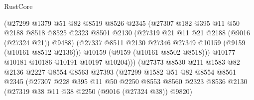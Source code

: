 \begin{lexlean}{RustCore}
\begin{coremodule}
                                (@27299
                                  @1379
                                  @51
                                  @82
                                  @8519
                                  @8526
                                  @2345
                                  (@27307
                                    @182
                                    @395
                                    @11
                                    @50
                                    @2188
                                    @8518
                                    @8525
                                    @2323
                                    @8501
                                    @2130
                                    (@27319 @21 @11 @21 @2188 (@9016 (@27324 @21)) @9488)
                                    (@27337
                                      @8511
                                      @2130
                                      @27346
                                      @27349
                                      @10159
                                      (@9159 (@10161 @8512 @2136)))
                                    @10159
                                    (@9159 (@10161 @8502 @8518)))
                                  @10177
                                  @10181
                                  @10186
                                  @10191
                                  @10197
                                  @10204)))
                            (@27373
                              @8530
                              @211
                              @1583
                              @82
                              @2136
                              @2227
                              @8554
                              @8563
                              @27393
                              (@27299
                                @1582
                                @51
                                @82
                                @8554
                                @8561
                                @2345
                                (@27307
                                  @228
                                  @395
                                  @11
                                  @50
                                  @2250
                                  @8553
                                  @8560
                                  @2323
                                  @8536
                                  @2130
                                  (@27319 @38 @11 @38 @2250 (@9016 (@27324 @38)) @9820)

\end{coremodule}
\end{lexlean}

